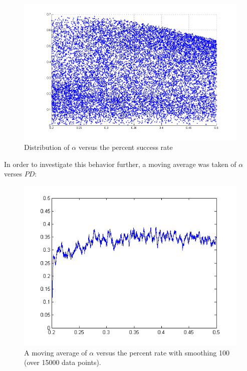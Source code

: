 \documentclass[a4paper]{article}
\begin{document}
\begin{figure}[H]\begin{center}
\includegraphics[scale=0.3]{../Matlab/Images/PctSuccessByAlpha.png}
\caption{Distribution of $\alpha$ versus the percent success rate}
\end{center}\end{figure}

In order to investigate this behavior further, a moving average was taken of $\alpha$ verses $PD$:

\begin{figure}[H]\begin{center}
\includegraphics[scale=.5]{../Matlab/Images/MovAvgAlphaPctSuccess.png}
\caption{A moving average of $\alpha$ versus the percent rate with smoothing 100 (over 15000 data points).}
\end{center}\end{figure}
\end{document}
